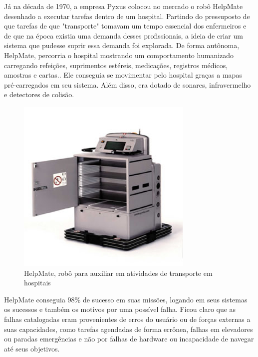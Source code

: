 Já na década de 1970, a empresa Pyxus colocou no mercado o robô HelpMate desenhado a executar tarefas dentro de um hospital. Partindo do pressuposto de que tarefas de que "transporte" tomavam um tempo essencial dos enfermeiros e de que na época existia uma demanda desses profissionais, a ideia de criar um sistema que pudesse suprir essa demanda foi explorada. De forma autônoma, HelpMate, percorria o hospital mostrando um comportamento humanizado carregando refeições, suprimentos estéreis, medicações, registros médicos, amostras e cartas.\cite{evans:1992}. Ele conseguia se movimentar pelo hospital graças a mapas pré-carregados em seu sistema. Além disso, era dotado de sonares, infravermelho e detectores de colisão.
\begin{figure}[H]
    \centering
    \includegraphics[width=0.75\textwidth]{figuras/helpmate.jpg}
    \caption{HelpMate, robô para auxiliar em atividades de transporte em hospitais}
    \label{fig:helpmate:robo}
\end{figure}

HelpMate conseguia 98\% de sucesso em suas missões, logando em seus sistemas os sucessos e também os  motivos por uma possível falha. Ficou claro que as falhas catalogadas eram provenientes de erros do usuário ou de forças externas a suas capacidades, como tarefas agendadas de forma errônea, falhas em elevadores ou paradas emergências e não por falhas de hardware ou incapacidade de navegar até seus objetivos.

